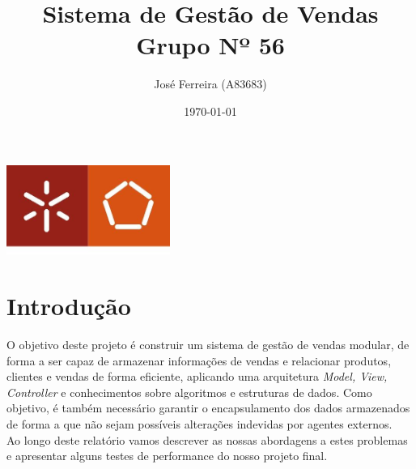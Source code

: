 \documentclass[a4paper]{report}
\begin{document}
\title{Sistema de Gestão de Vendas\\ 
\large Grupo Nº 56}
\author{José Ferreira (A83683)}
\date{\today}

\begin{center}
    \begin{minipage}{0.75\linewidth}
        \centering
        \includegraphics[width=0.4\textwidth]{eng.jpeg}\par\vspace{1cm}
        \vspace{1.5cm}
        \href{https://www.uminho.pt/PT}
        {\color{black}{\scshape\LARGE Universidade do Minho}} \par
        \vspace{1cm}
        \href{https://www.di.uminho.pt/}
        {\color{black}{\scshape\Large Departamento de Informática}} \par
        \vspace{1.5cm}
        \maketitle
    \end{minipage}
\end{center}

\tableofcontents

\pagebreak

\chapter{Introdução}

O objetivo deste projeto é construir um sistema de gestão de vendas modular,
de forma a ser capaz de armazenar informações de vendas e relacionar produtos,
clientes e vendas de forma eficiente, aplicando uma arquitetura \textit{Model, View,
Controller} e conhecimentos sobre algoritmos e estruturas de dados. Como objetivo, 
é também necessário garantir o encapsulamento dos dados armazenados de forma
a que não sejam possíveis alterações indevidas por agentes externos.\\
Ao longo deste relatório vamos descrever as nossas abordagens a estes problemas e
apresentar alguns testes de performance do nosso projeto final.
\end{document}

